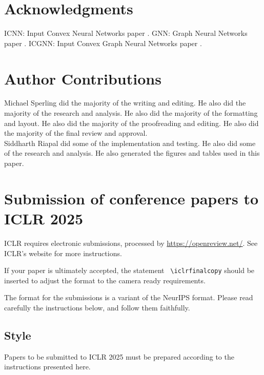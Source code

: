 \documentclass{article} %
\begin{document}
\section{Acknowledgments}
ICNN: Input Convex Neural Networks paper
\cite{amos2017input}.
GNN: Graph Neural Networks paper
\cite{kipf2016semi}.
ICGNN: Input Convex Graph Neural Networks paper
\cite{zhu2020input}.
\section{Author Contributions}
Michael Sperling did the majority of the writing and editing. He also did the majority of the research and analysis. He also did the majority of the formatting and layout. He also did the majority of the proofreading and editing. He also did the majority of the final review and approval.\\
Siddharth Riapal did some of the implementation and testing. He also did some of the research and analysis. He also generated the figures and tables used in this paper.
\section{Submission of conference papers to ICLR 2025}

ICLR requires electronic submissions, processed by
\url{https://openreview.net/}. See ICLR's website for more instructions.

If your paper is ultimately accepted, the statement {\tt
  {\textbackslash}iclrfinalcopy} should be inserted to adjust the
format to the camera ready requirements.

The format for the submissions is a variant of the NeurIPS format.
Please read carefully the instructions below, and follow them
faithfully.

\subsection{Style}

Papers to be submitted to ICLR 2025 must be prepared according to the
instructions presented here.

\end{document}
